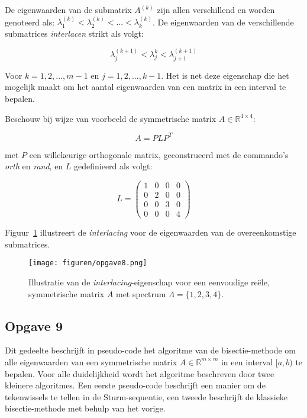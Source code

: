 \documentclass[a4paper, 12pt, titlepage]{report}
\begin{document}
De eigenwaarden van de submatrix $A^{(k)}$ zijn allen verschillend en worden genoteerd als: $\lambda^{(k)}_{1} < \lambda^{(k)}_{2} < ... < \lambda^{(k)}_{k}$. De eigenwaarden van de verschillende submatrices \emph{interlacen} strikt als volgt:

\begin{equation}
	\lambda^{(k+1)}_{j} < \lambda^{k}_{j} < \lambda^{(k+1)}_{j+1}
\end{equation}

Voor $k = 1,2,...,m-1$ en $j = 1,2,...,k-1$. Het is net deze eigenschap die het mogelijk maakt om het aantal eigenwaarden van een matrix in een interval te bepalen.

Beschouw bij wijze van voorbeeld de symmetrische matrix $A \in \mathbb{R}^{4 \times 4}$:

\begin{equation}
	A = PLP^{T}
\end{equation}

met $P$ een willekeurige orthogonale matrix, geconstrueerd met de commando's \emph{orth} en \emph{rand}, en $L$ gedefinieerd als volgt:

\begin{equation}
	L = \begin{pmatrix} 1 & 0 & 0 & 0 \\ 
											0 & 2 & 0 & 0 \\ 
											0 & 0 & 3 & 0 \\
											0 & 0 & 0 & 4 \end{pmatrix}
\end{equation}

Figuur~\ref{fig:opgave8} illustreert de \emph{interlacing} voor de eigenwaarden van de overeenkomstige submatrices. 

\begin{figure}[htb]
	\centering
	\texttt{[image: figuren/opgave8.png]}
	\caption{Illustratie van de \emph{interlacing}-eigenschap voor een eenvoudige re\"ele, symmetrische matrix $A$ met spectrum $\Lambda = \{1,2,3,4\}$.}
	\label{fig:opgave8}
\end{figure}

\subsection{Opgave 9}
Dit gedeelte beschrijft in pseudo-code het algoritme van de bisectie-methode om alle eigenwaarden van een symmetrische matrix $A \in \mathbb{R}^{m \times m}$ in een interval $[a,b)$ te bepalen. Voor alle duidelijkheid wordt het algoritme beschreven door twee kleinere algoritmes. Een eerste pseudo-code beschrijft een manier om de tekenwissels te tellen in de Sturm-sequentie, een tweede beschrijft de klassieke bisectie-methode met behulp van het vorige.
\end{document}
